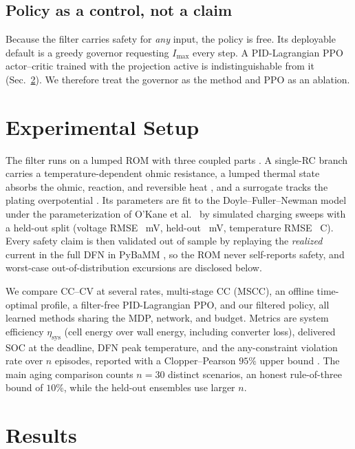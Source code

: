 \documentclass[conference]{IEEEtran}
\newcommand{\degC}{\textdegree C}
\begin{document}
\subsection{Policy as a control, not a claim}
Because the filter carries safety for \emph{any} input, the policy is free. Its deployable default is a
greedy governor requesting $I_{\max}$ every step. A PID-Lagrangian PPO actor--critic
\cite{schulman2017ppo,stooke2020pid} trained with the projection active is indistinguishable from it
(Sec.~\ref{sec:results}). We therefore treat the governor as the method and PPO as an ablation.

\section{Experimental Setup}
The filter runs on a lumped ROM with three coupled parts \cite{newman2004}. A single-RC branch carries
a temperature-dependent ohmic resistance, a lumped thermal state absorbs the ohmic, reaction, and
reversible heat \cite{bernardi1985}, and a surrogate tracks the plating overpotential
\cite{yang2017plating}. Its parameters are fit to the Doyle--Fuller--Newman model
\cite{doyle1993,fuller1994} under the parameterization of O'Kane et al.\ \cite{okane2022} by simulated charging
sweeps with a held-out split (voltage RMSE
\VRMSE~mV, held-out \VRMSEho~mV, temperature RMSE \TRMSE~\degC).
Every
safety claim is then validated out of sample by replaying the \emph{realized} current in the full DFN
in PyBaMM \cite{sulzer2021pybamm}, so the ROM never self-reports safety, and worst-case out-of-distribution excursions are disclosed below.

We compare CC--CV at several rates, multi-stage CC (MSCC), an offline time-optimal profile, a
filter-free PID-Lagrangian PPO, and our filtered policy, all learned methods sharing the MDP,
network, and budget. Metrics are system efficiency $\eta_\mathrm{sys}$ (cell energy over wall energy,
including converter loss), delivered SOC at the deadline, DFN peak temperature, and the
any-constraint violation rate over $n$ episodes, reported with a Clopper--Pearson $95\%$ upper bound
\cite{clopper1934}.
The main aging comparison counts $n{=}30$ distinct scenarios, an honest rule-of-three bound of $10\%$,
while the held-out ensembles use larger $n$.

\section{Results}\label{sec:results}
\end{document}
